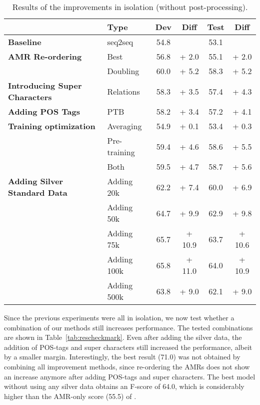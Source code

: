 \documentclass[a4paper,10pt,twoside]{article}
\begin{document}
\begin{table}[!htb]
\centering
\caption{\label{tab:resiso}Results of the improvements in isolation (without post-processing).}
\begin{tabular}{ll|cc|cc}
\toprule
                         & \textbf{Type}  & \textbf{Dev} & \textbf{Diff} & \textbf{Test} & \textbf{Diff} \\ \midrule
\textbf{Baseline}        & seq2seq        & 54.8         &               & 53.1          &               \\ \midrule
\textbf{AMR Re-ordering} & Best           & 56.8         & + 2.0         & 55.1          & + 2.0         \\
                         & Doubling       & 60.0         & + 5.2         & 58.3          & + 5.2         \\ \midrule
 
\textbf{Introducing Super Characters} & Relations & 58.3 & + 3.5    & 57.4 & + 4.3    \\ \midrule

\textbf{Adding POS Tags}              & PTB      & 58.2 & + 3.4    & 57.2 & + 4.1    \\ \midrule

\textbf{Training optimization}        & Averaging        & 54.9 & + 0.1 & 53.4  & + 0.3   \\
                                      & Pre-training     & 59.4 & + 4.6 & 58.6  & + 5.5   \\
                                      & Both             & 59.5 & + 4.7 & 58.7  & + 5.6        \\ \midrule

\textbf{Adding Silver Standard Data}  & Adding 20k  & 62.2 & + 7.4  & 60.0 & + 6.9  \\
                                      & Adding 50k  & 64.7 & + 9.9  & 62.9 & + 9.8  \\
                                      & Adding 75k  & 65.7 & + 10.9 & 63.7 & + 10.6 \\
                                      & Adding 100k & 65.8 & + 11.0 & 64.0 & + 10.9 \\ 
                                      & Adding 500k & 63.8 & + 9.0  & 62.1 & + 9.0  \\ 
\bottomrule 
\end{tabular}
\end{table}

Since the previous experiments were all in isolation, we now test whether a combination of our methods still increases performance. The tested combinations are shown in Table~\ref{tab:rescheckmark}. Even after adding the silver data, the addition of POS-tags and super characters still increased the performance, albeit by a smaller margin. Interestingly, the best result (71.0) was not obtained by combining all improvement methods, since re-ordering the AMRs does not show an increase anymore after adding POS-tags and super characters. The best model without using any silver data obtains an F-score of 64.0, which is considerably higher than the AMR-only score (55.5) of . 
\end{document}
